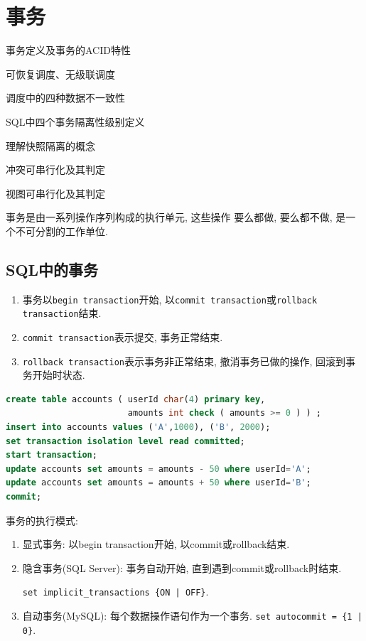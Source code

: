 \chapter{事务}

\begin{introduction}[期末考试提纲]
  \item 事务定义及事务的ACID特性
  \item 可恢复调度、无级联调度
  \item 调度中的四种数据不一致性
  \item SQL中四个事务隔离性级别定义
  \item 理解快照隔离的概念
  \item 冲突可串行化及其判定
  \item 视图可串行化及其判定
\end{introduction}

\begin{definition}[事务]
  事务是由一系列操作序列构成的执行单元, 这些操作
要么都做, 要么都不做, 是一个不可分割的工作单位.
\end{definition}

\section{SQL中的事务}

\begin{enumerate}
    \item 事务以\verb|begin transaction|开始, 以\verb|commit transaction|或\verb|rollback transaction|结束.
    \item \verb|commit transaction|表示提交, 事务正常结束.
    \item \verb|rollback transaction|表示事务非正常结束, 撤消事务已做的操作, 回滚到事务开始时状态.
\end{enumerate}

\begin{lstlisting}[language=SQL]
create table accounts ( userId char(4) primary key,
                        amounts int check ( amounts >= 0 ) ) ;
insert into accounts values ('A',1000), ('B', 2000);
set transaction isolation level read committed;
start transaction;
update accounts set amounts = amounts - 50 where userId='A';
update accounts set amounts = amounts + 50 where userId='B';
commit;
\end{lstlisting}

事务的执行模式:
\begin{enumerate}
    \item 显式事务: 以begin transaction开始, 以commit或rollback结束.
    \item 隐含事务(SQL Server): 事务自动开始, 直到遇到commit或rollback时结束.
    
    \verb+set implicit_transactions {ON | OFF}+.
    \item 自动事务(MySQL): 每个数据操作语句作为一个事务. \verb+set autocommit = {1 | 0}+.
\end{enumerate}

